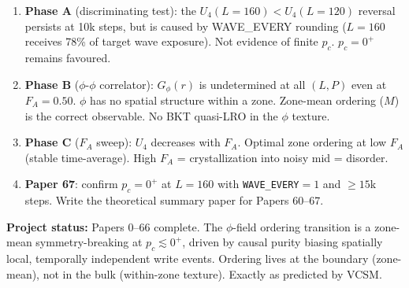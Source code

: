 \documentclass[12pt,a4paper]{article}
\begin{document}
\begin{enumerate}
\item \textbf{Phase A} (discriminating test): the $U_4(L=160) < U_4(L=120)$
  reversal persists at 10k steps, but is caused by WAVE\_EVERY rounding
  ($L=160$ receives 78\% of target wave exposure).
  Not evidence of finite $p_c$.  $p_c = 0^+$ remains favoured.
\item \textbf{Phase B} ($\phi$-$\phi$ correlator): $G_\phi(r)$ is undetermined
  at all $(L, P)$ even at $F_A=0.50$.  $\phi$ has no spatial structure within
  a zone.  Zone-mean ordering ($M$) is the correct observable.
  No BKT quasi-LRO in the $\phi$ texture.
\item \textbf{Phase C} ($F_A$ sweep): $U_4$ decreases with $F_A$.
  Optimal zone ordering at low $F_A$ (stable time-average).
  High $F_A$ = crystallization into noisy mid = disorder.
\item \textbf{Paper 67}: confirm $p_c = 0^+$ at $L=160$ with
  \texttt{WAVE\_EVERY}$=1$ and $\ge 15$k steps.
  Write the theoretical summary paper for Papers 60--67.
\end{enumerate}

\vspace{1em}
\noindent\textbf{Project status:} Papers 0--66 complete.
The $\phi$-field ordering transition is a zone-mean symmetry-breaking at
$p_c \lesssim 0^+$, driven by causal purity biasing spatially local, temporally
independent write events. Ordering lives at the boundary (zone-mean), not in
the bulk (within-zone texture). Exactly as predicted by VCSM.
\end{document}

